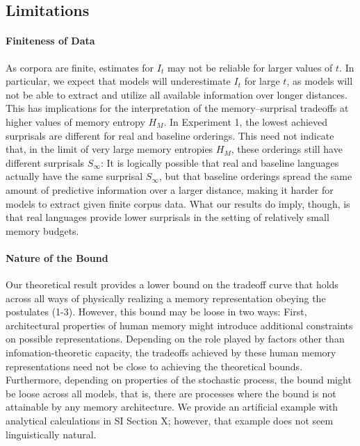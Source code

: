 \subsection{Limitations}

\paragraph{Finiteness of Data}
As corpora are finite, estimates for $I_t$ may not be reliable for larger values of $t$.
In particular, we expect that models will underestimate $I_t$ for large $t$, as models will not be able to extract and utilize all available information over longer distances.
This has implications for the interpretation of the memory--surprisal tradeoffs at higher values of memory entropy $H_M$.
In Experiment 1, the lowest achieved surprisals are different for real and baseline orderings.
This need not indicate that, in the limit of very large memory entropies $H_M$, these orderings still have different surprisals $S_\infty$:
It is logically possible that real and baseline languages actually have the same surprisal $S_\infty$, but that baseline orderings spread the same amount of predictive information over a larger distance, making it harder for models to extract given finite corpus data.
What our results do imply, though, is that real languages provide lower surprisals in the setting of relatively small memory budgets.


\paragraph{Nature of the Bound}
Our theoretical result provides a lower bound on the tradeoff curve that holds across all ways of physically realizing a memory representation obeying the postulates (1-3).
However, this bound may be loose in two ways:
First, architectural properties of human memory might introduce additional constraints on possible representations.
Depending on the role played by factors other than infomation-theoretic capacity, the tradeoffs achieved by these human memory representations need not be close to achieving the theoretical bounds.
Furthermore, depending on properties of the stochastic process, the bound might be loose across all models, that is, there are processes where the bound is not attainable by any memory architecture.
We provide an artificial example with analytical calculations in SI Section X; however, that example does not seem linguistically natural.

